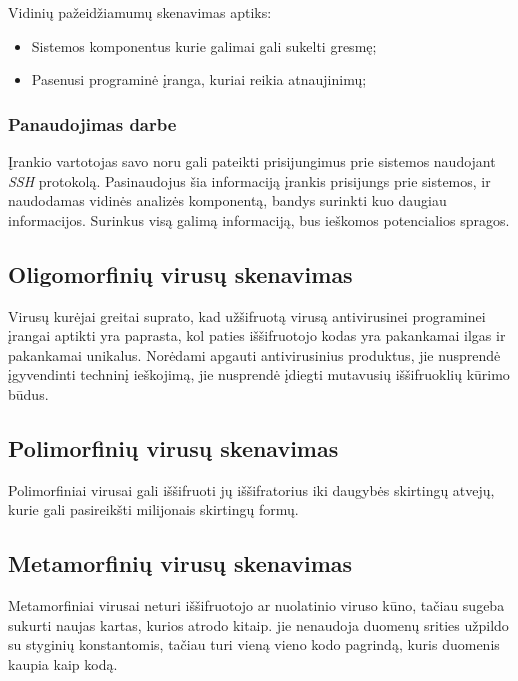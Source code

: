 \documentclass[a4paper,12pt,fleqn]{article}
\begin{document}
Vidinių pažeidžiamumų skenavimas aptiks:
\begin{itemize}
	\item Sistemos komponentus kurie galimai gali sukelti gresmę;
	\item Pasenusi programinė įranga, kuriai reikia atnaujinimų;
\end{itemize}

\subsubsection{Panaudojimas darbe}
\label{sec:data}
Įrankio vartotojas savo noru gali pateikti prisijungimus prie sistemos naudojant \textit{SSH} protokolą. Pasinaudojus šia informaciją įrankis prisijungs prie sistemos, ir naudodamas vidinės analizės komponentą, bandys surinkti kuo daugiau informacijos. Surinkus visą galimą informaciją, bus ieškomos potencialios spragos.

\subsection{Oligomorfinių virusų skenavimas}
\label{sec:example}

Virusų kurėjai greitai suprato, kad užšifruotą virusą antivirusinei programinei įrangai aptikti yra paprasta, kol paties iššifruotojo kodas yra pakankamai ilgas ir pakankamai unikalus. Norėdami apgauti antivirusinius produktus, jie nusprendė įgyvendinti techninį ieškojimą, jie nusprendė įdiegti mutavusių iššifruoklių kūrimo būdus. \cite{Szor:2005:ACV:1050957}

\subsection{Polimorfinių virusų skenavimas}
\label{sec:example}

Polimorfiniai virusai gali iššifruoti jų iššifratorius iki daugybės skirtingų atvejų, kurie gali pasireikšti milijonais skirtingų formų. \cite{Szor:2005:ACV:1050957}

\subsection{Metamorfinių virusų skenavimas}
\label{sec:example}

Metamorfiniai virusai neturi iššifruotojo ar nuolatinio viruso kūno, tačiau sugeba sukurti naujas kartas, kurios atrodo kitaip. jie nenaudoja duomenų srities užpildo su styginių konstantomis, tačiau turi vieną vieno kodo pagrindą, kuris duomenis kaupia kaip kodą. \cite{Szor:2005:ACV:1050957}
\end{document}
